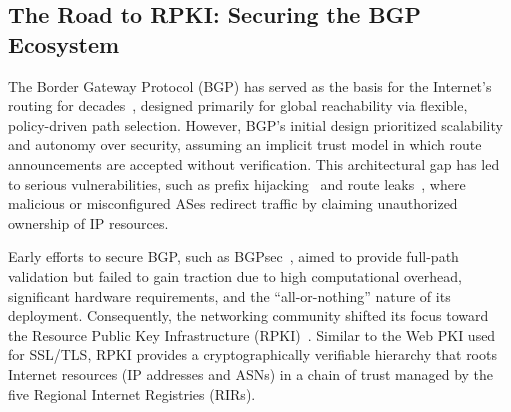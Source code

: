 \documentclass[conference]{IEEEtran}
\newcommand{\md}[1]{{\color{purple}#1}}
\begin{document}


\iffalse
\subsection{The Road to RPKI: Securing the BGP Ecosystem}
\md{The Border Gateway Protocol (BGP) has served as the basis for the Internet's routing for decades~\cite{lougheed1990rfc1163}, designed primarily for global reachability via flexible, policy-driven path selection. However, BGP’s initial design prioritized scalability and autonomy over security, assuming an implicit trust model in which route announcements are accepted without verification. This architectural gap has led to serious vulnerabilities, such as prefix hijacking~\cite{prefixHijacking} and route leaks~\cite{McDanielSS21BGPLeak}, where malicious or misconfigured ASes redirect traffic by claiming unauthorized ownership of IP resources.}

\md{Early efforts to secure BGP, such as BGPsec~\cite{rfc8205BGPSec}, aimed to provide full-path validation but failed to gain traction due to high computational overhead, significant hardware requirements, and the ``all-or-nothing'' nature of its deployment. Consequently, the networking community shifted its focus toward the Resource Public Key Infrastructure (RPKI)~\cite{RPKI}. Similar to the Web PKI used for SSL/TLS, RPKI provides a cryptographically verifiable hierarchy that roots Internet resources (IP addresses and ASNs) in a chain of trust managed by the five Regional Internet Registries (RIRs).}
\end{document}
